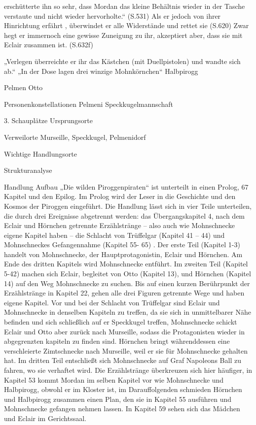 erschütterte ihn so sehr, dass Mordan das kleine Behältnis wieder in der Tasche verstaute und nicht wieder hervorholte.“ (S.531) Als er jedoch von ihrer Hinrichtung erfährt , überwindet er alle Widerstände und rettet sie (S.620) Zwar hegt er immernoch eine gewisse Zuneigung zu ihr, akzeptiert aber, dass sie mit Eclair zusammen ist. (S.632f)

„Verlegen überreichte er ihr das Kästchen (mit Duellpistolen) und wandte sich ab.“
„In der Dose lagen drei winzige Mohnkörnchen“
Halbpirogg


Pelmen Otto


Personenkonstellationen
Pelmeni
Speckkugelmannschaft

		3. Schauplätze 
Ursprungsorte


Verweilorte
Murseille, Speckkugel, Pelmenidorf 

Wichtige Handlungsorte
		
Strukturanalyse

Handlung
Aufbau
„Die wilden Piroggenpiraten“ ist unterteilt in einen Prolog, 67 Kapitel und den Epilog. Im Prolog wird der Leser in die Geschichte und den Kosmos der Piroggen eingeführt. Die Handlung lässt sich in vier Teile unterteilen, die durch drei Ereignisse abgetrennt werden: das Übergangskapitel 4, nach dem Eclair und Hörnchen getrennte Erzählstränge – also auch wie Mohnschnecke eigene Kapitel haben – die Schlacht von Trüffelgar (Kapitel 41 – 44) und Mohnschneckes Gefangennahme (Kapitel 55- 65) . Der erste Teil (Kapitel 1-3) handelt von Mohnschnecke, der Hauptprotagonistin, Eclair und Hörnchen. Am Ende des dritten Kapitels wird Mohnschnecke entführt. Im zweiten Teil (Kapitel 5-42) machen sich Eclair, begleitet von Otto (Kapitel 13), und Hörnchen (Kapitel 14) auf den Weg Mohnschnecke zu suchen. Bis auf einen kurzen Berührpunkt der Erzählstränge in Kapitel 22, gehen alle drei Figuren getrennte Wege und haben eigene Kapitel. Vor und bei der Schlacht von Trüffelgar sind Eclair und Mohnschnecke in denselben Kapiteln zu treffen, da sie sich in unmittelbarer Nähe befinden und sich schließlich auf er Speckkugel treffen,  Mohnschnecke schickt Eclair und Otto aber zurück nach Murseille, sodass die Protagonisten wieder in abgegrenzten kapiteln zu finden sind. Hörnchen bringt währenddessen eine verschleierte Zimtschnecke nach Murseille, weil er sie für Mohnschnecke gehalten hat. Im dritten Teil entschließt sich Mohnschnecke auf Graf Napoleons Ball zu fahren, wo sie verhaftet wird. Die Erzählstränge überkreuzen sich hier häufiger, in Kapitel 53 kommt Mordan im selben Kapitel vor wie Mohnschnecke und Halbpirogg, obwohl er im Kloster ist, im Darauffolgenden schmieden Hörnchen und Halbpirogg zusammen einen Plan, den sie in Kapitel 55 ausführen und Mohnschnecke gefangen nehmen lassen. In Kapitel 59 sehen sich das Mädchen und Eclair im Gerichtssaal. 

